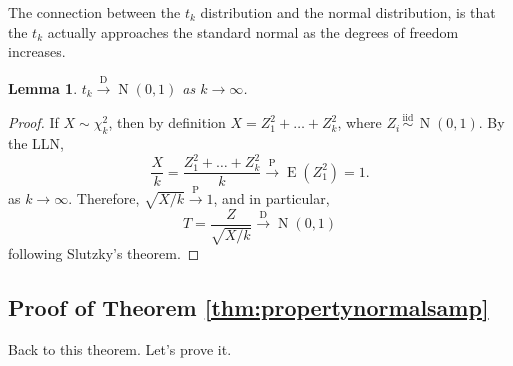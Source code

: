 \documentclass[
]{book}
\DeclareMathOperator{\E}{E}
\DeclareMathOperator{\N}{N}
\newcommand{\iid}{\,\overset{\text{iid}}{\sim}\,}
\newtheorem{lemma}{Lemma}[chapter]
\theoremstyle{definition}
\theoremstyle{definition}
\theoremstyle{definition}
\theoremstyle{definition}
\theoremstyle{remark}
\begin{document}
The connection between the \(t_k\) distribution and the normal distribution, is that the \(t_k\) actually approaches the standard normal as the degrees of freedom increases.

\begin{lemma}
\(t_k \xrightarrow{\text{D}} \N(0,1)\) as \(k\to\infty\).
\end{lemma}

\begin{proof}
If \(X\sim\chi^2_k\), then by definition
\(X = Z_1^2 + \dots + Z_k^2\), where \(Z_i\iid\N(0,1)\). By the LLN,
\[\frac{X}{k} = \frac{Z_1^2 + \dots + Z_k^2}{k} \xrightarrow{\text{P}} \E(Z_1^2) = 1.\]
as \(k\to\infty\). Therefore, \(\sqrt{X/k} \xrightarrow{\text{P}} 1\), and
in particular,
\[T = \frac{Z}{\sqrt{X/k}} \xrightarrow{\text{D}} \N(0,1)\]
following Slutzky's theorem.
\end{proof}

\hypertarget{proof-of-theorem-refthmpropertynormalsamp}{%
\subsection{Proof of Theorem \ref{thm:propertynormalsamp}}\label{proof-of-theorem-refthmpropertynormalsamp}}

Back to this theorem. Let's prove it.
\end{document}
